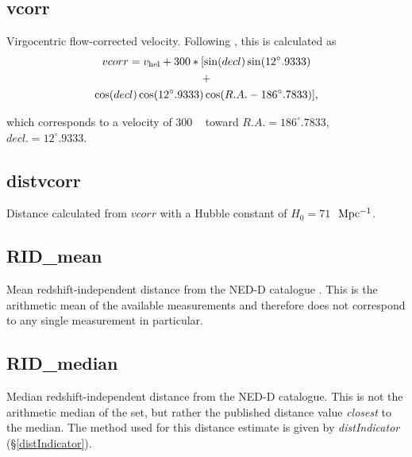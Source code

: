 \subsection{vcorr} \label{vcorr}
Virgocentric flow-corrected velocity. Following \cite{huchra1982, geller1983}, this is calculated as
\begin{gather*}
	vcorr = v_{\rm hel} + 300*[\sin(decl) \sin(12^{\circ}.9333) \\
	+ \\
	\cos(decl) \cos(12^{\circ}.9333) \cos(R.A. - 186^{\circ}.7833)],
\end{gather*}

\noindent which corresponds to a velocity of 300 \kms~ toward $R.A. = 186^{\circ}.7833$, $decl. = 12^{\circ}.9333$.



\subsection{distvcorr} \label{distvcorr}
Distance calculated from $vcorr$ with a Hubble constant of $H_0 = 71$ \kms $~\rm Mpc^{-1}$.

\subsection{RID\_mean} \label{RID_mean}
Mean redshift-independent distance from the NED-D catalogue \citep{tully2009}. This is the arithmetic mean of the available measurements and therefore does not correspond to any single measurement in particular.

\subsection{RID\_median} \label{RID_median}
Median redshift-independent distance from the NED-D catalogue. This is not the arithmetic median of the set, but rather the published distance value \emph{closest} to the median. The method used for this distance estimate is given by \emph{distIndicator} (\S \ref{distIndicator}).

